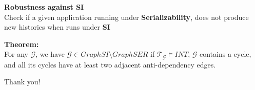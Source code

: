\documentclass{beamer}
\begin{document}
\begin{frame}
	\textbf{Robustness against SI} \\
	Check if a given application running under \textbf{Serializability}, does not produce new histories when runs under \textbf{SI}
\end{frame}


\begin{frame}
\textbf{Theorem:} \\
For any $\mathcal{G}$, we have $\mathcal{G} \in GraphSI \setminus GraphSER $ if $\mathcal{T}_\mathcal{G} \vDash INT$, $\mathcal{G}$ contains a cycle, and all its cycles have at least two adjacent anti-dependency edges.
\end{frame}

\begin{frame}
\begin{center}
	Thank you!
\end{center}
\end{frame}
\end{document}
